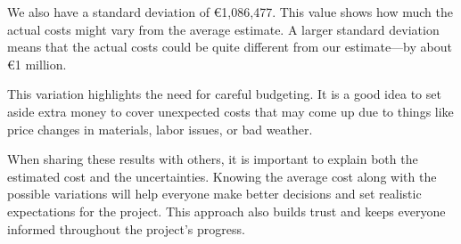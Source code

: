 \documentclass{article}
\begin{document}
We also have a standard deviation of €1,086,477. This value shows how much the actual costs might vary from the average estimate. A larger standard deviation means that the actual costs could be quite different from our estimate—by about €1 million.

This variation highlights the need for careful budgeting. It is a good idea to set aside extra money to cover unexpected costs that may come up due to things like price changes in materials, labor issues, or bad weather.

When sharing these results with others, it is important to explain both the estimated cost and the uncertainties. Knowing the average cost along with the possible variations will help everyone make better decisions and set realistic expectations for the project. This approach also builds trust and keeps everyone informed throughout the project's progress.
\end{document}

